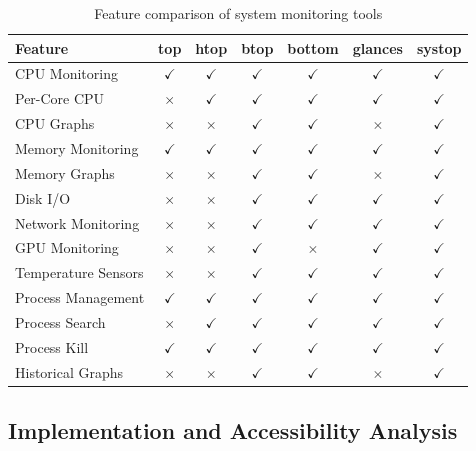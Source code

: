 \documentclass[12pt,a4paper,oneside]{report}
\begin{document}
\begin{table}[h]
\centering
\caption{Feature comparison of system monitoring tools}
\label{tab:feature-comparison}
\small
\begin{tabular}{|l|c|c|c|c|c|c|}
\hline
\textbf{Feature} & \textbf{top} & \textbf{htop} & \textbf{btop} & \textbf{bottom} & \textbf{glances} & \textbf{systop} \\
\hline
CPU Monitoring & $\checkmark$ & $\checkmark$ & $\checkmark$ & $\checkmark$ & $\checkmark$ & $\checkmark$ \\
Per-Core CPU & $\times$ & $\checkmark$ & $\checkmark$ & $\checkmark$ & $\checkmark$ & $\checkmark$ \\
CPU Graphs & $\times$ & $\times$ & $\checkmark$ & $\checkmark$ & $\times$ & $\checkmark$ \\
Memory Monitoring & $\checkmark$ & $\checkmark$ & $\checkmark$ & $\checkmark$ & $\checkmark$ & $\checkmark$ \\
Memory Graphs & $\times$ & $\times$ & $\checkmark$ & $\checkmark$ & $\times$ & $\checkmark$ \\
Disk I/O & $\times$ & $\times$ & $\checkmark$ & $\checkmark$ & $\checkmark$ & $\checkmark$ \\
Network Monitoring & $\times$ & $\times$ & $\checkmark$ & $\checkmark$ & $\checkmark$ & $\checkmark$ \\
GPU Monitoring & $\times$ & $\times$ & $\checkmark$ & $\times$ & $\checkmark$ & $\checkmark$ \\
Temperature Sensors & $\times$ & $\times$ & $\checkmark$ & $\checkmark$ & $\checkmark$ & $\checkmark$ \\
Process Management & $\checkmark$ & $\checkmark$ & $\checkmark$ & $\checkmark$ & $\checkmark$ & $\checkmark$ \\
Process Search & $\times$ & $\checkmark$ & $\checkmark$ & $\checkmark$ & $\checkmark$ & $\checkmark$ \\
Process Kill & $\checkmark$ & $\checkmark$ & $\checkmark$ & $\checkmark$ & $\checkmark$ & $\checkmark$ \\
Historical Graphs & $\times$ & $\times$ & $\checkmark$ & $\checkmark$ & $\times$ & $\checkmark$ \\
\hline
\end{tabular}
\end{table}

\subsection{Implementation and Accessibility Analysis}
\end{document}
